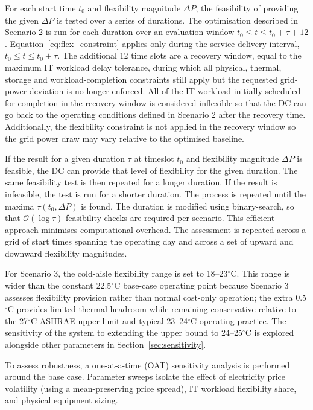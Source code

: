 \documentclass[lettersize,journal]{IEEEtran}
\newcommand{\rev}[1]{\textcolor{blue!70!black}{#1}}
\begin{document}
\rev{For each start time $t_0$ and flexibility magnitude $\Delta P$, the feasibility of providing the given $\Delta P$ is tested over a series of durations. The optimisation described in Scenario 2 is run for each duration over an evaluation window $t_0 \leq t \leq t_0 + \tau + 12$. Equation~\ref{eq:flex_constraint} applies only during the service-delivery interval, $t_0 \leq t \leq t_0+\tau$. The additional 12 time slots are a recovery window, equal to the maximum IT workload delay tolerance, during which all physical, thermal, storage and workload-completion constraints still apply but the requested grid-power deviation is no longer enforced.} All of the IT workload initially scheduled for completion in the recovery window is considered inflexible so that the DC can go back to the operating conditions defined in Scenario 2 after the recovery time. Additionally, the flexibility constraint is not applied in the recovery window so the grid power draw may vary relative to the optimised baseline.

If the result for a given duration $\tau$ at timeslot $t_0$ and flexibility magnitude $\Delta P$ is feasible, the DC can provide that level of flexibility for the given duration. The same feasibility test is then repeated for a longer duration. If the result is infeasible, the test is run for a shorter duration. The process is repeated until the maxima $\tau(t_0, \Delta P)$ is found. The duration is modified using binary-search, so that $\mathcal{O}(\log \tau)$ feasibility checks are required per scenario. This efficient approach minimises computational overhead. The assessment is repeated across a grid of start times spanning the operating day and across a set of upward and downward flexibility magnitudes.

\rev{For Scenario 3, the cold-aisle flexibility range is set to 18--23$^\circ$C. This range is wider than the constant 22.5$^\circ$C base-case operating point because Scenario 3 assesses flexibility provision rather than normal cost-only operation; the extra 0.5$^\circ$C provides limited thermal headroom while remaining conservative relative to the 27$^\circ$C ASHRAE upper limit \cite{tc2016data} and typical 23--24$^\circ$C operating practice. The sensitivity of the system to extending the upper bound to 24--25$^\circ$C is explored alongside other parameters in Section~\ref{sec:sensitivity}.}

\rev{To assess robustness, a one-at-a-time (OAT) sensitivity analysis is performed around the base case. Parameter sweeps isolate the effect of electricity price volatility (using a mean-preserving price spread), IT workload flexibility share, and physical equipment sizing.}
\end{document}
